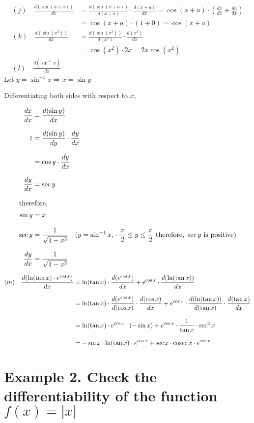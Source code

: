 


\begin{align*}
(j) \quad \frac{d(\sin(x + a))}{dx} &= \frac{d (\sin(x + a))}{d(x + a)} \cdot \frac{d(x + a)}{dx} = \cos (x + a) \cdot \left( \frac{dx}{dx} + \frac{da}{dx} \right) \\
&= \cos (x + a) \cdot (1 + 0) = \cos (x + a) \\
(k) \quad \frac{d (\sin (x^2))}{dx} & = \frac{d (\sin (x^2))}{d (x^2)} \cdot \frac{d (x^2)}{dx} \\[8pt]
& = \cos (x^2) \cdot 2x = 2x \cos (x^2) \\[8pt]
(l) \quad \frac{d (\sin^{-1} x)}{dx}
\end{align*}
Let \( y = \sin^{-1} x \Rightarrow x = \sin y \)

Differentiating both sides with respect to \( x \),

\begin{align*}
\frac{dx}{dx} &= \frac{d (\sin y)}{dx} \\[8pt]
1 & = \frac{d (\sin y)}{dy} \cdot \frac{dy}{dx} \\[8pt]
& = \cos y \cdot \frac{dy}{dx} \\[8pt]
\frac{dy}{dx} &= \sec y \\[8pt]
\intertext{therefore,}
\sin y &= x \\[8pt]
\sec y &= \frac{1}{\sqrt{1 - x^2}} \quad (y = \sin^{-1} x, -\frac{\pi}{2} \leq y \leq \frac{\pi}{2} \text{ therefore, } \sec y \text{ is positive}) \\[8pt]
\frac{dy}{dx} & = \frac{1}{\sqrt{1 - x^2}}
\end{align*}

\begin{align*}
(m) \quad \frac{d (\ln (\tan x) \cdot e^{\cos x})}{dx} & = \ln (\tan x) \cdot \frac{d (e^{\cos x})}{dx} + e^{\cos x} \cdot \frac{d (\ln (\tan x))}{dx} \\[8pt]
& = \ln (\tan x) \cdot \frac{d (e^{\cos x})}{d(\cos x)} \cdot \frac{d (\cos x)}{dx} + e^{\cos x} \cdot \frac{d (\ln (\tan x))}{d (\tan x)} \cdot \frac{d (\tan x)}{dx} \\[8pt]
& = \ln (\tan x) \cdot e^{\cos x} \cdot (-\sin x) + e^{\cos x} \cdot \frac{1}{\tan x} \cdot \sec^2 x \\[8pt]
& = - \sin x \cdot \ln (\tan x) \cdot e^{\cos x} + \sec x \cdot \operatorname{cosec} x \cdot e^{\cos x}
\end{align*}

\section*{Example 2. Check the differentiability of the function \( f(x) = | x | \)}

